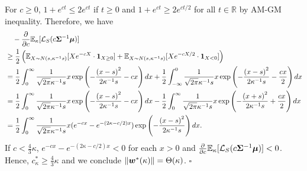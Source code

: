 For $c \geq 0$, $1+e^{ct} \leq 2e^{ct}$ if $t\geq 0$ and $1+e^{ct} \geq 2 e^{ct/2}$ for all $t\in \mathbb{R}$ by AM-GM inequality. Therefore, we have
\begin{align*}
    &\quad -\frac{\partial}{\partial c} \mathbb{E}_\kappa[\mathcal{L}_S(c{\bm{\Sigma}}^{-1}{\bm{\mu}})] \\
    &\geq \frac{1}{2} \left (\mathbb{E}_{X \sim N \left(s, \kappa^{-1} s\right)}[X e^{-cX} \cdot {\bm{1}}_{X\geq 0}]+ \mathbb{E}_{X \sim N \left(s, \kappa^{-1} s\right)}[Xe^{-cX/2} \cdot {\bm{1}}_{X<0}] \right)\\
    &= \frac{1}{2} \int_0^\infty \frac{1}{\sqrt{2\pi}\kappa^{-1} s}x \exp\left(-\frac{\left(x-s\right)^2}{2\kappa^{-1} s}-cx\right)dx + \frac{1}{2} \int_{-\infty}^0  \frac{1}{\sqrt{2\pi}\kappa^{-1}s}x \exp\left(-\frac{\left(x-s\right)^2}{2\kappa^{-1} s}-\frac{cx}{2}\right)dx\\
    &= \frac{1}{2} \int_0^\infty \frac{1}{\sqrt{2\pi}\kappa^{-1} s}x \exp\left(-\frac{\left(x-s\right)^2}{2\kappa^{-1} s}-cx\right)dx - \frac{1}{2} \int_0^\infty  \frac{1}{\sqrt{2\pi}\kappa^{-1}s}x \exp\left(-\frac{\left(x+s\right)^2}{2\kappa^{-1} s}+\frac{cx}{2}\right)dx\\
    &= \frac{1}{2} \int_0^\infty \frac{1}{\sqrt{2\pi}\kappa^{-1} s}x (e^{-cx}-e^{-(2\kappa-c/2)x})\exp\left(-\frac{\left(x-s\right)^2}{2\kappa^{-1} s}\right) dx.
\end{align*}
If $c < \frac{4}{3}\kappa$, $e^{-cx}-e^{-(2\kappa-c/2) x}<0$ for each $x>0$ and $\frac{\partial}{\partial c} \mathbb{E}_\kappa[\mathcal{L}_S(c{\bm{\Sigma}}^{-1}{\bm{\mu}})]<0$. Hence, $c_\kappa^* \geq \frac{4}{3}\kappa$ and we conclude $\lVert {\bm{w}}^*(\kappa)\rVert = \Theta(\kappa)$.
\hfill $\square$